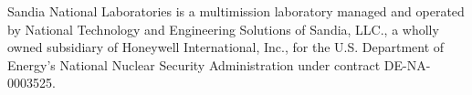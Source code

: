 
Sandia National Laboratories is a multimission laboratory managed
and operated by National Technology and Engineering Solutions of
Sandia, LLC., a wholly owned subsidiary of Honeywell International,
Inc., for the U.S. Department of Energy's National Nuclear Security
Administration under contract DE-NA-0003525.
